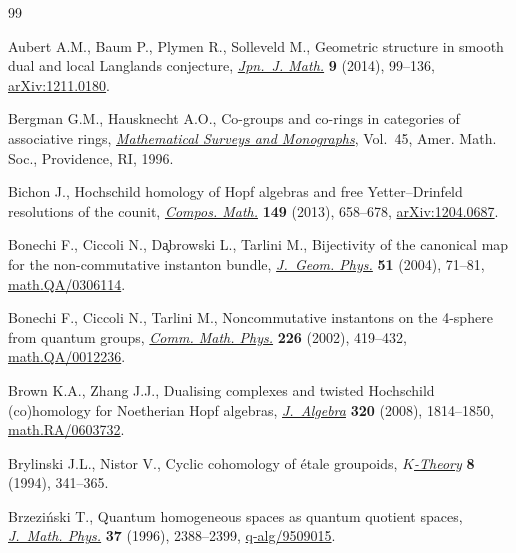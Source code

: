 \documentclass[pdftex]{sigma}
\numberwithin{equation}{section}
\begin{document}
\begin{thebibliography}{99}
\footnotesize \itemsep=0pt

Aubert A.M., Baum P., Plymen R., Solleveld M., Geometric structure in smooth
  dual and local {L}anglands conjecture, \href{http://dx.doi.org/10.1007/s11537-014-1267-x}{\textit{Jpn.~J. Math.}} \textbf{9}
  (2014), 99--136, \href{http://arxiv.org/abs/1211.0180}{arXiv:1211.0180}.

Bergman G.M., Hausknecht A.O., Co-groups and co-rings in categories of
  associative rings, \href{http://dx.doi.org/10.1090/surv/045}{\textit{Mathematical Surveys and Monographs}}, Vol.~45,
  Amer. Math. Soc., Providence, RI, 1996.

Bichon J., Hochschild homology of {H}opf algebras and free {Y}etter--{D}rinfeld
  resolutions of the counit, \href{http://dx.doi.org/10.1112/S0010437X12000656}{\textit{Compos. Math.}} \textbf{149} (2013),
  658--678, \href{http://arxiv.org/abs/1204.0687}{arXiv:1204.0687}.

Bonechi F., Ciccoli N., D\c{a}browski L., Tarlini M., Bijectivity of the
  canonical map for the non-commutative instanton bundle, \href{http://dx.doi.org/10.1016/j.geomphys.2003.09.007}{\textit{J.~Geom.
  Phys.}} \textbf{51} (2004), 71--81, \href{http://arxiv.org/abs/math.QA/0306114}{math.QA/0306114}.

Bonechi F., Ciccoli N., Tarlini M., Noncommutative instantons on the 4-sphere
  from quantum groups, \href{http://dx.doi.org/10.1007/s002200200618}{\textit{Comm. Math. Phys.}} \textbf{226} (2002),
  419--432, \href{http://arxiv.org/abs/math.QA/0012236}{math.QA/0012236}.

Brown K.A., Zhang J.J., Dualising complexes and twisted {H}ochschild
  (co)homology for {N}oetherian {H}opf algebras, \href{http://dx.doi.org/10.1016/j.jalgebra.2007.03.050}{\textit{J.~Algebra}}
  \textbf{320} (2008), 1814--1850, \href{http://arxiv.org/abs/math.RA/0603732}{math.RA/0603732}.

Brylinski J.L., Nistor V., Cyclic cohomology of \'etale groupoids,
  \href{http://dx.doi.org/10.1007/BF00961407}{\textit{$K$-Theory}} \textbf{8} (1994), 341--365.

Brzezi{\'n}ski T., Quantum homogeneous spaces as quantum quotient spaces,
  \href{http://dx.doi.org/10.1063/1.531517}{\textit{J.~Math. Phys.}} \textbf{37} (1996), 2388--2399,
  \href{http://arxiv.org/abs/q-alg/9509015}{q-alg/9509015}.


\end{thebibliography}
\end{document}
